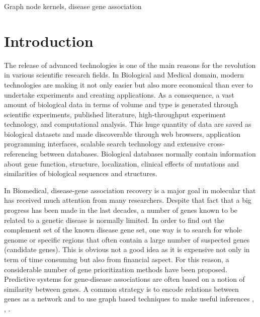 \documentclass[review]{elsarticle}
\begin{document}
\begin{frontmatter}
\begin{abstract}
\end{abstract}

\begin{keyword}
Graph node kernels, disease gene association
\end{keyword}
\end{frontmatter}

\linenumbers
\section{Introduction}

The release of advanced technologies is one of the main reasons for the
revolution in various scientific research fields. In Biological and Medical domain, modern technologies are making it not only easier but also more economical than ever to undertake experiments and creating applications. As a consequence, a vast amount of biological data in terms of volume and type is generated through scientific experiments, published literature, high-throughput experiment technology, and computational analysis. This huge quantity of data are saved as biological datasets and made discoverable through web browsers, application programming interfaces, scalable search technology and extensive cross-referencing between databases. Biological databases normally contain information about gene function, structure, localization, clinical effects of mutations and similarities of biological sequences and structures.

In Biomedical, disease-gene association recovery is a major goal in molecular  that has received much attention from many researchers. Despite that fact that a big progress has been made in the last decades, a number of genes known to be related to a genetic disease is normally limited. In order to find out the complement set of the known disease gene set, one way is to search for whole genome or specific regions that often contain a large number of suspected genes (candidate genes). This is obvious not a good idea as it is expensive not only in term of time consuming but also from financial aspect. For this reason, a considerable number of gene prioritization methods have been proposed. Predictive systems for gene-disease associations are often based on a notion of similarity between genes. A common strategy is to encode relations between genes as a network and to use graph based techniques to make useful inferences \cite{mordelet2011prodige}, \cite{chen2014disease}, \cite{valentini2014extensive}.
\end{document}
